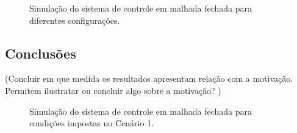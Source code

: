 \begin{figure}[!ht]
    \caption{Simulação do sistema de controle em malhada fechada para diferentes
    configurações.}
    \vspace{-10pt}
    \hspace{-30pt}
    \label{fig:desafio2:resultado-questao6}
    \begin{minipage}{\linewidth}
        
    \end{minipage}
\end{figure}

\subsection{Conclusões}
(Concluir em que medida os resultados apresentam relação com a motivação.
Permitem ilustratar ou concluir algo sobre a motivação? )

\begin{figure}[!ht]
    \caption{Simulação do sistema de controle em malhada fechada para condições
    impostas no Cenário 1.}
    \vspace{-10pt}
    \hspace{-30pt}
    \label{fig:resultado-extra-desafio2-questao6}
    \begin{minipage}{\linewidth}
        
    \end{minipage}
\end{figure}